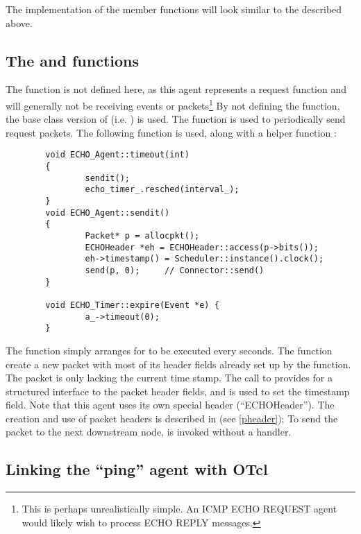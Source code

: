 The implementation of the member functions will look similar to
the  described above.

\subsection{The  and  functions}

The  function is not defined here, as this agent
represents a request function and will generally not be receiving
events or packets\footnote{This is perhaps unrealistically simple.
An ICMP ECHO REQUEST agent would likely wish to process
ECHO REPLY messages.}
By not defining the  function, the base class version
of  (i.e. ) is used.
The  function is used to periodically send request packets.
The following  function is used, along with a helper
function :

\begin{small}
\begin{verbatim}
        void ECHO_Agent::timeout(int)
        {
                sendit();
                echo_timer_.resched(interval_);
        }
        void ECHO_Agent::sendit()
        {
                Packet* p = allocpkt();
                ECHOHeader *eh = ECHOHeader::access(p->bits());
                eh->timestamp() = Scheduler::instance().clock();
                send(p, 0);     // Connector::send()
        }

        void ECHO_Timer::expire(Event *e) {
                a_->timeout(0);
        }
\end{verbatim}
\end{small}

The  function simply arranges for  to be
executed every  seconds.
The  function create a new packet with most of its
header fields already set up by the  function.
The packet is only lacking the current time stamp. 
The call to  provides for a structured interface to the
packet header fields, and is used to set the timestamp field.
Note that this agent uses its own special header (``ECHOHeader'').
The creation and use of packet headers is described in (see \ref{pheader});
To send the packet to the next downstream node, 
is invoked without a handler.

\subsection{Linking the ``ping'' agent with OTcl}


